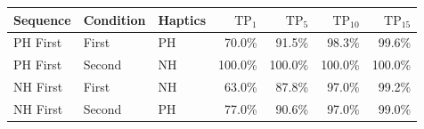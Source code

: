 \begin{tabular}{lllrrrr}
\toprule
 Sequence & Condition & Haptics &  $\mathrm{TP}_{ 1 }$ &  $\mathrm{TP}_{ 5 }$ &  $\mathrm{TP}_{ 10 }$ &  $\mathrm{TP}_{ 15 }$ \\
\midrule
 PH First &  First  &  PH & 70.0\%  & 91.5\%  & 98.3\%  & 99.6\%  \\
 PH First &  Second &  NH & 100.0\% & 100.0\% & 100.0\% & 100.0\% \\
 NH First &  First  &  NH & 63.0\%  & 87.8\%  & 97.0\%  & 99.2\%  \\
 NH First &  Second &  PH & 77.0\%  & 90.6\%  & 97.0\%  & 99.0\%  \\
\bottomrule
\end{tabular}
